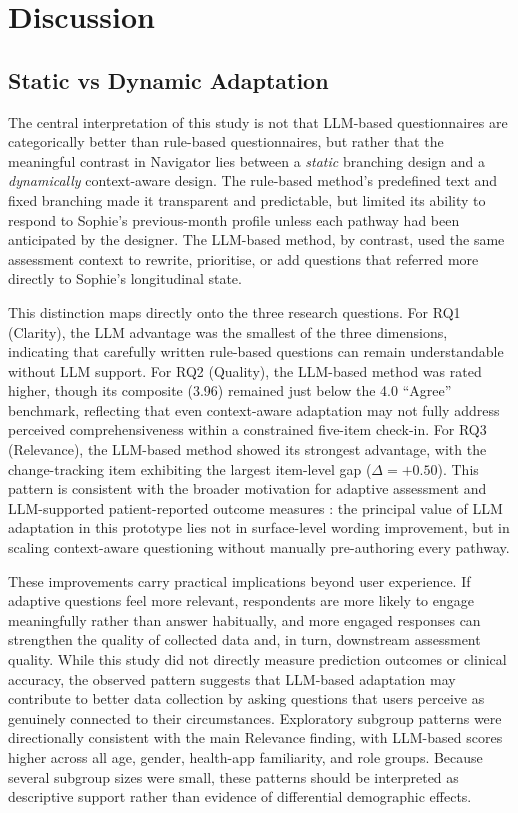 \documentclass[conference]{IEEEtran}
\begin{document}
\section{Discussion}
\label{sec:discussion}

\subsection{Static vs Dynamic Adaptation}
\label{subsec:static_dynamic}

The central interpretation of this study is not that LLM-based questionnaires
are categorically better than rule-based questionnaires, but rather that the
meaningful contrast in Navigator lies between a \emph{static} branching design
and a \emph{dynamically} context-aware design. The rule-based method's
predefined text and fixed branching made it transparent and predictable, but
limited its ability to respond to Sophie's previous-month profile unless each
pathway had been anticipated by the designer. The LLM-based method, by
contrast, used the same assessment context to rewrite, prioritise, or add
questions that referred more directly to Sophie's longitudinal state.

This distinction maps directly onto the three research questions. For RQ1
(Clarity), the LLM advantage was the smallest of the three dimensions,
indicating that carefully written rule-based questions can remain
understandable without LLM support. For RQ2 (Quality), the LLM-based method
was rated higher, though its composite (3.96) remained just below the 4.0
``Agree'' benchmark, reflecting that even context-aware adaptation may not
fully address perceived comprehensiveness within a constrained five-item
check-in. For RQ3 (Relevance), the LLM-based method showed its strongest
advantage, with the change-tracking item exhibiting the largest item-level
gap ($\Delta=+0.50$). This pattern is consistent with the broader
motivation for adaptive assessment and LLM-supported patient-reported
outcome measures \cite{wang2023,terheyden2025}: the principal value of LLM
adaptation in this prototype lies not in surface-level wording improvement,
but in scaling context-aware questioning without manually pre-authoring
every pathway.

These improvements carry practical implications beyond user experience. If
adaptive questions feel more relevant, respondents are more likely to
engage meaningfully rather than answer habitually, and more engaged
responses can strengthen the quality of collected data and, in turn,
downstream assessment quality. While this study did not directly measure
prediction outcomes or clinical accuracy, the observed pattern suggests
that LLM-based adaptation may contribute to better data collection by
asking questions that users perceive as genuinely connected to their
circumstances. Exploratory subgroup patterns were directionally
consistent with the main Relevance finding, with LLM-based scores higher
across all age, gender, health-app familiarity, and role groups. Because
several subgroup sizes were small, these patterns should be interpreted
as descriptive support rather than evidence of differential demographic
effects.
\end{document}
